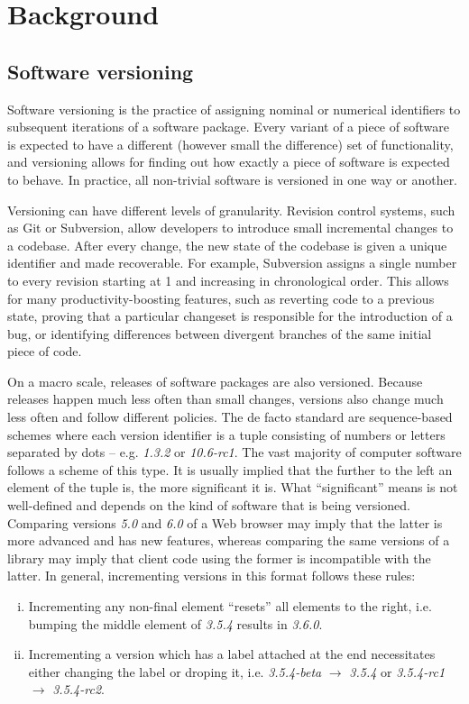 \documentclass{l4proj}
\begin{document}
\section{Background}

\subsection{Software versioning}
Software versioning is the practice of assigning nominal or numerical
identifiers to subsequent iterations of a software package. Every
variant of a piece of software is expected to have a different
(however small the difference) set of functionality, and versioning
allows for finding out how exactly a piece of software is expected to
behave. In practice, all non-trivial software is versioned in one way
or another.

Versioning can have different levels of granularity. Revision control
systems, such as Git or Subversion, allow developers to introduce
small incremental changes to a codebase. After every change, the new
state of the codebase is given a unique identifier and made
recoverable. For example, Subversion assigns a single number to every
revision starting at 1 and increasing in chronological order. This
allows for many productivity-boosting features, such as reverting code
to a previous state, proving that a particular changeset is
responsible for the introduction of a bug, or identifying differences
between divergent branches of the same initial piece of code.

On a macro scale, releases of software packages are also versioned.
Because releases happen much less often than small changes, versions
also change much less often and follow different policies. The de
facto standard are sequence-based schemes where each version
identifier is a tuple consisting of numbers or letters separated by
dots -- e.g. \textit{1.3.2} or \textit{10.6-rc1}. The vast majority of
computer software follows a scheme of this type. It is usually implied
that the further to the left an element of the tuple is, the more
significant it is. What ``significant'' means is not well-defined and
depends on the kind of software that is being versioned. Comparing
versions \textit{5.0} and \textit{6.0} of a Web browser may imply that
the latter is more advanced and has new features, whereas comparing
the same versions of a library may imply that client code using the
former is incompatible with the latter. In general, incrementing
versions in this format follows these rules:
\begin{enumerate}[(i)]
\item Incrementing any non-final element ``resets'' all elements to
the right, i.e. bumping the middle element of \textit{3.5.4} results
in \textit{3.6.0}.
\item Incrementing a version which has a label attached at the end
necessitates either changing the label or droping it, i.e.
\textit{3.5.4-beta} $\rightarrow$ \textit{3.5.4} or \textit{3.5.4-rc1}
$\rightarrow $ \textit{3.5.4-rc2}.
\end{enumerate}
\end{document}
